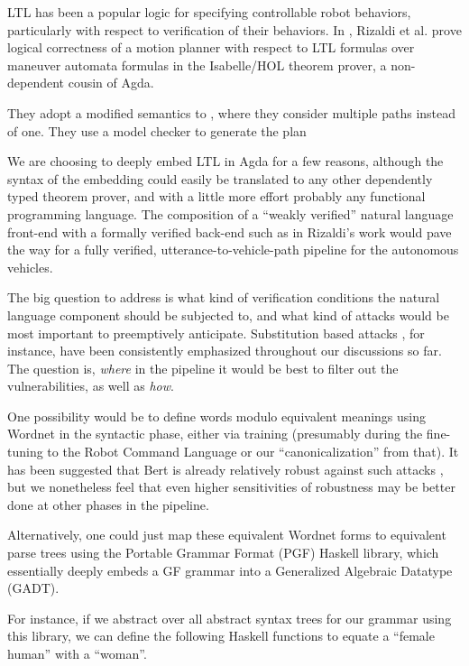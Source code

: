 \documentclass[a4paper, 11pt]{article}
\begin{document}
LTL has been a popular logic for specifying controllable robot behaviors,
particularly with respect to verification of their behaviors. In
\cite{verifiedMotion}, Rizaldi et al. prove logical correctness of a motion
planner with respect to LTL formulas over maneuver automata formulas in the
Isabelle/HOL theorem prover, a non-dependent cousin of Agda.

They adopt a
modified semantics to \cite{fainekos2005temporal}, where they consider multiple
paths instead of one. They use a model checker to generate the plan

We are choosing to
deeply embed LTL in Agda for a few reasons, although the syntax of the embedding
could easily be translated to any other dependently typed theorem prover, and
with a little more effort probably any functional programming language. The
composition of a ``weakly verified'' natural language front-end with a formally
verified back-end such as in Rizaldi's work would pave the way for a fully
verified, utterance-to-vehicle-path pipeline for the autonomous vehicles.

The big question to address is what kind of verification conditions the natural
language component should be subjected to, and what kind of attacks would be
most important to preemptively anticipate. Substitution based attacks
\cite{substAttacks}, for instance, have been consistently emphasized throughout
our discussions so far. The question is, \emph{where} in the pipeline it would
be best to filter out the vulnerabilities, as well as \emph{how}.

One possibility would be to define words modulo equivalent meanings using
Wordnet \cite{wordnet} in the syntactic phase, either via training
\cite{ren-etal-2019-generating} (presumably during the fine-tuning to the Robot
Command Language or our ``canonicalization'' from that). It has been suggested
that Bert is already relatively robust against such attacks
\cite{hauser2021bert}, but we nonetheless feel that even higher sensitivities of
robustness may be better done at other phases in the pipeline.

Alternatively, one could just map these equivalent Wordnet forms to equivalent
parse trees using the Portable Grammar Format (PGF) Haskell library, which
essentially deeply embeds a GF grammar into a Generalized Algebraic Datatype
(GADT).

For instance, if we abstract over all abstract syntax trees for our grammar
using this library, we can define the following Haskell functions to equate a
``female human'' with a ``woman''. 
\end{document}
